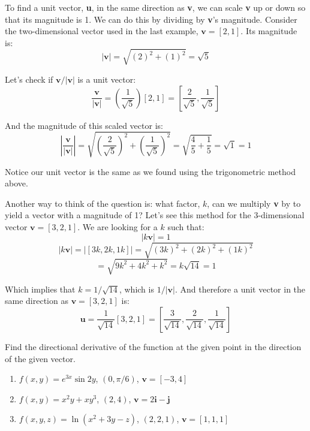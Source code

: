 To find a unit vector, \textbf{u}, in the same direction as \textbf{v}, we can 
scale \textbf{v} up or down so that its magnitude is 1. We can do this by 
dividing by \textbf{v}'s magnitude. Consider the two-dimensional vector used 
in the last example, $\textbf{v} = \left[ 2, 1 \right]$. Its magnitude is:
$$| \textbf{v} | = \sqrt{\left( 2 \right)^2 + \left( 1 \right)^2} = \sqrt{5}$$

Let's check if $\textbf{v} / | \textbf{v} |$ is a unit vector:
$$ \frac{\textbf{v}}{|\textbf{v}|} = \left( \frac{1}{\sqrt{5}} \right) \left[ 
2, 1 \right] = \left[ \frac{2}{\sqrt{5}}, \frac{1}{\sqrt{5}} \right]$$

And the magnitude of this scaled vector is:
$$ \left| \frac{\textbf{v}}{| \textbf{v} |} \right| = \sqrt{\left( \frac{2}{
\sqrt{5}} \right)^2 + \left( \frac{1}{\sqrt{5}} \right)^2} = \sqrt{\frac{4}{5} 
+ \frac{1}{5}} = \sqrt{1} = 1$$

Notice our unit vector is the same as we found using the trigonometric method 
above. 

Another way to think of the question is: what factor, $k$, can we multiply 
\textbf{v} by to yield a vector with a magnitude of 1? Let's see this method 
for the 3-dimensional vector $\textbf{v} = \left[ 3, 2, 1 \right]$. We are 
looking for a $k$ such that:
$$|k\textbf{v}| = 1$$
$$|k \textbf{v}| = \left| \left[ 3k, 2k, 1k \right] \right| = \sqrt{\left( 3k 
\right)^2 + \left( 2k \right)^2 + \left( 1k \right)^2}$$
$$= \sqrt{9k^2 + 4k^2 + k^2} = k\sqrt{14} = 1$$

Which implies that $k = 1/\sqrt{14}$, which is $1/|\textbf{v}|$. And therefore 
a unit vector in the same direction as $\textbf{v} = \left[ 3, 2, 1 \right]$ 
is:
$$\textbf{u} = \frac{1}{\sqrt{14}} \left[ 3, 2, 1 \right] = \left[ \frac{3}{
\sqrt{14}}, \frac{2}{\sqrt{14}}, \frac{1}{\sqrt{14}} \right]$$


\begin{Exercise}[title = {Finding Directional Derivatives}, label = direction]
Find the directional derivative of the function at the given point in the 
direction of the given vector. 
\begin{enumerate}
    \item $f(x, y) = e^{3x} \sin{2y}$, $(0, \pi/6)$, $\textbf{v} = \left[ -3, 
    4 \right]$
    \item $f(x, y) = x^2y + xy^3$, $(2, 4)$, $\textbf{v} = 2 \textbf{i} - 
    \textbf{j}$
    \item $f(x, y, z) = \ln{ \left( x^2 + 3y - z \right)}$, $(2, 2, 1)$, 
    $\textbf{v} = \left[ 1, 1, 1 \right]$
\end{enumerate}
\vspace{100mm}
\end{Exercise}

